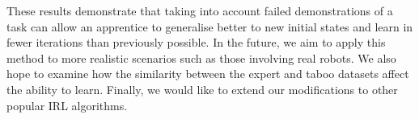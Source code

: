 \documentclass[conference]{IEEEtran}
\begin{document}
These results demonstrate that taking into account failed demonstrations of a task can allow an apprentice to generalise better to new initial states and learn in fewer iterations than previously possible.  In the future, we aim to apply this method to more realistic scenarios such as those involving real robots. We also hope to examine how the similarity between the expert and taboo datasets affect the ability to learn. Finally, we would like to extend our modifications to other popular IRL algorithms.

%
%
%
%
%
%
%
%
%  
%
\end{document}

